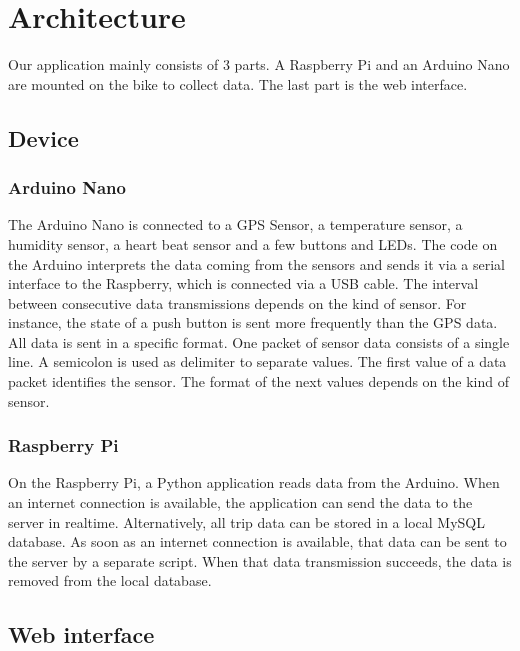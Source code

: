 \section{Architecture}
Our application mainly consists of 3 parts. 
A Raspberry Pi and an Arduino Nano are mounted on the bike to collect data. 
The last part is the web interface.
\subsection{Device}
\subsubsection{Arduino Nano}
The Arduino Nano is connected to a GPS Sensor, a temperature sensor, a humidity sensor, a heart beat sensor and a few buttons and LEDs. 
The code on the Arduino interprets the data coming from the sensors and sends it via a serial interface to the Raspberry, which is connected via a USB cable.
The interval between consecutive data transmissions depends on the kind of sensor. 
For instance, the state of a push button is sent more frequently than the GPS data.
All data is sent in a specific format. One packet of sensor data consists of a single line.
A semicolon is used as delimiter to separate values. The first value of a data packet identifies the sensor. 
The format of the next values depends on the kind of sensor.
\subsubsection{Raspberry Pi}
On the Raspberry Pi, a Python application reads data from the Arduino. 
When an internet connection is available, the application can send the data to the server in realtime.
Alternatively, all trip data can be stored in a local MySQL database. 
As soon as an internet connection is available, that data can be sent to the server by a separate script.
When that data transmission succeeds, the data is removed from the local database.
\subsection{Web interface}

